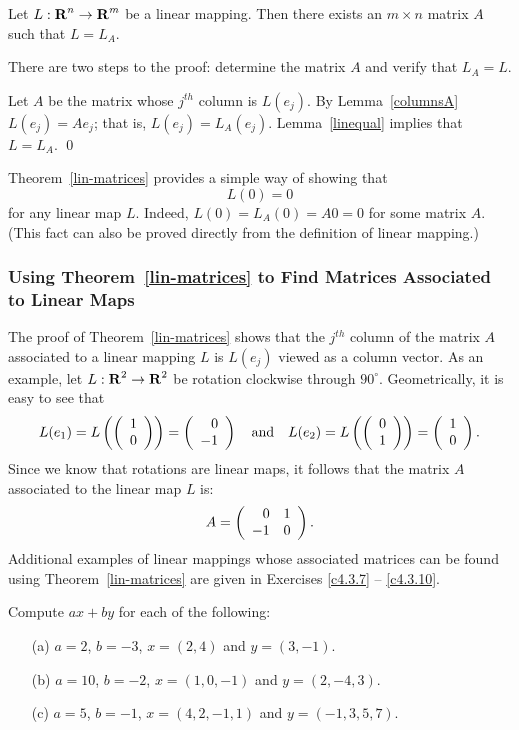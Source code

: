\begin{thm}  \label{lin-matrices}
Let $L:\mbox{$\bf{R}$}^n\to\mbox{$\bf{R}$}^m$ be a linear mapping.
Then there exists an $m\times n$ matrix $A$ such that $L=L_A$.
\end{thm}

\proof
There are two steps to the proof: determine the matrix $A$ and
verify that $L_A=L$.

Let $A$ be the matrix whose $j^{th}$ column is $L(e_j)$.  By
Lemma~\ref{columnsA} $L(e_j) = Ae_j$; that is, $L(e_j) = L_A(e_j)$.
Lemma~\ref{linequal} implies that $L=L_A$.  \qed

Theorem~\ref{lin-matrices} provides a simple way of showing that
\[
L(0) = 0
\]
for any linear map $L$.  Indeed, $L(0)=L_A(0)=A0=0$ for some matrix $A$.  
(This fact can also be proved directly from the definition of linear mapping.)

\subsubsection*{Using Theorem~\protect\ref{lin-matrices} to Find Matrices
Associated to Linear Maps}

The proof of Theorem~\ref{lin-matrices} shows that the $j^{th}$ column of the
matrix $A$ associated to a linear mapping $L$ is $L(e_j)$ viewed as a column
vector.  As an example, let $L:\mbox{$\bf{R}$}^2\to\mbox{$\bf{R}$}^2$ be rotation clockwise through
$90^\circ$.  Geometrically, it is easy to see that
\[
L(e_1) = L\left(\left(\begin{array}{r} 1 \\ 0\end{array}\right)\right) = \left(\begin{array}{r} 0 \\ -1\end{array}\right) \quad\mbox{and}\quad
L(e_2) = L\left(\left(\begin{array}{r} 0 \\ 1\end{array}\right)\right) = \left(\begin{array}{r} 1 \\ 0\end{array}\right).
\]
Since we know that rotations are linear maps, it follows that the matrix
$A$ associated to the linear map $L$ is:
\[
A = \left(\begin{array}{rr} 0 & 1\\ -1 &0\end{array}\right).
\]
Additional examples of linear mappings whose associated matrices can be found
using Theorem~\ref{lin-matrices} are given in Exercises \ref{c4.3.7} --
\ref{c4.3.10}.



\EXER

\TEXER

\begin{exercise} \label{c4.3.1}
Compute $ax+by$ for each of the following:
\begin{itemize}
\item[(a)] $a=2$, $b=-3$, $x=(2,4)$ and $y=(3,-1)$.
\item[(b)] $a=10$, $b=-2$, $x=(1,0,-1)$ and $y=(2,-4,3)$.
\item[(c)] $a=5$, $b=-1$, $x=(4,2,-1,1)$ and $y=(-1,3,5,7)$.
\end{itemize}
\end{exercise}

